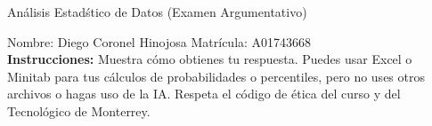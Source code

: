 \documentclass[8pt]{report}
\begin{document}
\newpage



\begin{center}
{An\'alisis Estad\'stico de Datos (Examen Argumentativo)}
\end{center}

Nombre: \underline{\hspace*{.2in}}
Diego Coronel Hinojosa
\underline{\hspace*{.2in}} \quad Matr\'icula:\underline{\hspace*{.2in}}
A01743668
\underline{\hspace*{.2in}} \\

{\bf Instrucciones:} Muestra c\'omo obtienes tu respuesta. Puedes usar Excel 
o Minitab para tus cálculos de probabilidades o 
percentiles, pero no uses otros archivos o hagas uso de la IA. Respeta el 
c\'odigo de \'etica del curso y del Tecnol\'ogico 
de Monterrey.
\end{document}
